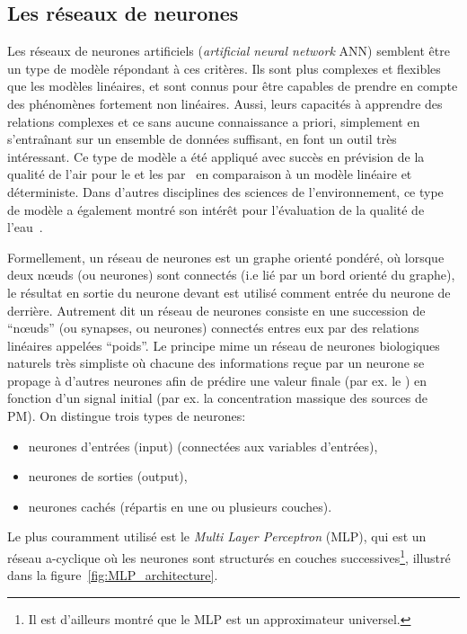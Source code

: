 \subsection{Les réseaux de neurones}%
\label{sub:les_réseaux_de_neurones}

Les réseaux de neurones artificiels (\textit{artificial neural network} ANN) semblent être
un type de modèle répondant à ces critères. Ils sont plus complexes et flexibles que les
modèles linéaires, et sont connus pour être capables de prendre en compte des phénomènes
fortement non linéaires. Aussi, leurs capacités à apprendre des relations complexes et ce
sans aucune connaissance a priori, simplement en s'entraînant sur un ensemble de données
suffisant, en font un outil très intéressant.
Ce type de modèle a été appliqué avec succès en prévision de la qualité de l'air pour le
 et les \PMdix{} par~\cite{kukkonenExtensive2003} en comparaison à un modèle
linéaire et déterministe. Dans d'autres disciplines des sciences de l'environnement, ce
type de modèle a également montré son intérêt pour l'évaluation de la qualité de
l'eau~\autocite{nathanApplication2017}.

Formellement, un réseau de neurones est un graphe orienté pondéré, où lorsque deux
nœuds (ou neurones) sont connectés (i.e lié par un bord orienté du graphe), le résultat en
sortie du neurone devant est utilisé comment entrée du neurone de derrière.
Autrement dit un réseau de neurones consiste en une succession de ``nœuds'' (ou synapses, ou
neurones) connectés entres eux par des relations linéaires appelées ``poids''. Le principe
mime un réseau de neurones biologiques naturels très simpliste où chacune des
informations reçue par un neurone se propage à d'autres neurones afin de prédire une
valeur finale (par ex. le \POv) en fonction d'un signal initial (par ex. la
concentration massique des sources de PM).
On distingue trois types de neurones:
\begin{itemize}
    \item neurones d'entrées (input) (connectées aux variables d'entrées),
    \item neurones de sorties (output),
    \item neurones cachés (répartis en une ou plusieurs couches).
\end{itemize}
Le plus couramment utilisé est le \textit{Multi Layer Perceptron} (MLP), qui est un
réseau a-cyclique où les neurones sont structurés en couches successives\footnote{Il est
d'ailleurs montré que le MLP est un approximateur universel.}, illustré dans la
figure~\ref{fig:MLP_architecture}.

